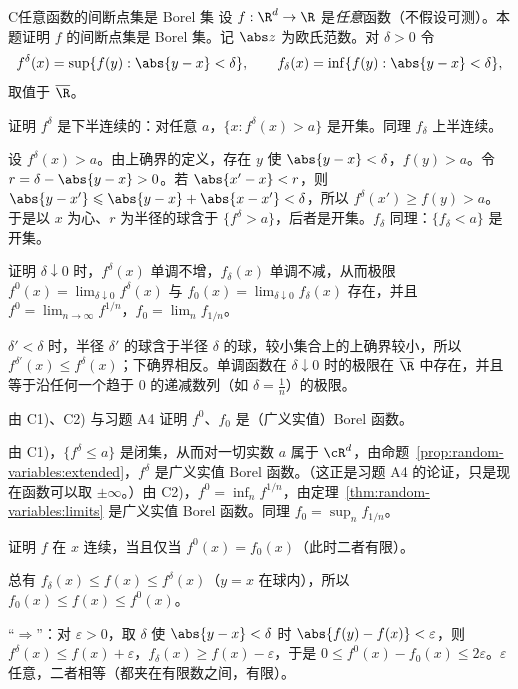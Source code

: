 \begin{probleme}{C}{任意函数的间断点集是 Borel 集}
设 $f:\R^d\to\R$ 是\emph{任意}函数（不假设可测）。本题证明 $f$ 的间断点集是 Borel 集。记 $\abs z$ 为欧氏范数。对 $\delta>0$ 令
\[
f^\delta(x)=\sup\{f(y):\abs{y-x}<\delta\},\qquad f_\delta(x)=\inf\{f(y):\abs{y-x}<\delta\},
\]
取值于 $\overline\R$。
\begin{questions}
\item 证明 $f^\delta$ 是下半连续的：对任意 $a$，$\{x:f^\delta(x)>a\}$ 是开集。同理 $f_\delta$ 上半连续。
\begin{solution}
设 $f^\delta(x)>a$。由上确界的定义，存在 $y$ 使 $\abs{y-x}<\delta$，$f(y)>a$。令 $r=\delta-\abs{y-x}>0$。若 $\abs{x'-x}<r$，则 $\abs{y-x'}\leqslant\abs{y-x}+\abs{x-x'}<\delta$，所以 $f^\delta(x')\geqslant f(y)>a$。于是以 $x$ 为心、$r$ 为半径的球含于 $\{f^\delta>a\}$，后者是开集。$f_\delta$ 同理：$\{f_\delta<a\}$ 是开集。
\end{solution}
\item 证明 $\delta\downarrow0$ 时，$f^\delta(x)$ 单调不增，$f_\delta(x)$ 单调不减，从而极限 $f^0(x)=\lim_{\delta\downarrow0}f^\delta(x)$ 与 $f_0(x)=\lim_{\delta\downarrow0}f_\delta(x)$ 存在，并且 $f^0=\lim_{n\to\infty}f^{1/n}$，$f_0=\lim_nf_{1/n}$。
\begin{solution}
$\delta'<\delta$ 时，半径 $\delta'$ 的球含于半径 $\delta$ 的球，较小集合上的上确界较小，所以 $f^{\delta'}(x)\leqslant f^\delta(x)$；下确界相反。单调函数在 $\delta\downarrow0$ 时的极限在 $\overline\R$ 中存在，并且等于沿任何一个趋于 $0$ 的递减数列（如 $\delta=\frac1n$）的极限。
\end{solution}
\item 由 C1)、C2) 与习题 A4 证明 $f^0$、$f_0$ 是（广义实值）Borel 函数。
\begin{solution}
由 C1)，$\{f^\delta\leqslant a\}$ 是闭集，从而对一切实数 $a$ 属于 $\cR^d$，由命题~\ref{prop:random-variables:extended}，$f^\delta$ 是广义实值 Borel 函数。（这正是习题 A4 的论证，只是现在函数可以取 $\pm\infty$。）由 C2)，$f^0=\inf_nf^{1/n}$，由定理~\ref{thm:random-variables:limits} 是广义实值 Borel 函数。同理 $f_0=\sup_nf_{1/n}$。
\end{solution}
\item 证明 $f$ 在 $x$ 连续，当且仅当 $f^0(x)=f_0(x)$（此时二者有限）。
\begin{solution}
总有 $f_\delta(x)\leqslant f(x)\leqslant f^\delta(x)$（$y=x$ 在球内），所以 $f_0(x)\leqslant f(x)\leqslant f^0(x)$。

“$\Rightarrow$”：对 $\varepsilon>0$，取 $\delta$ 使 $\abs{y-x}<\delta$ 时 $\abs{f(y)-f(x)}<\varepsilon$，则 $f^\delta(x)\leqslant f(x)+\varepsilon$，$f_\delta(x)\geqslant f(x)-\varepsilon$，于是 $0\leqslant f^0(x)-f_0(x)\leqslant2\varepsilon$。$\varepsilon$ 任意，二者相等（都夹在有限数之间，有限）。


\end{solution}
\end{questions}
\end{probleme}
